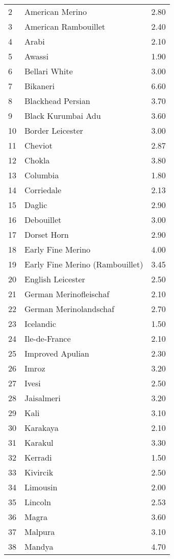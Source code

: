 \begin{center}
\begin{longtable}{|p{1.0in}|p{2.0in}|p{1.0in}|}
  2 &  American Merino & 2.80 \\ 
  3 &  American Rambouillet & 2.40 \\ 
  4 &  Arabi & 2.10 \\ 
  5 &  Awassi & 1.90 \\ 
  6 &  Bellari White & 3.00 \\ 
  7 &  Bikaneri & 6.60 \\ 
  8 &  Blackhead Persian & 3.70 \\ 
  9 &  Black Kurumbai Adu & 3.60 \\ 
  10 &  Border Leicester & 3.00 \\ 
  11 &  Cheviot & 2.87 \\ 
  12 &  Chokla & 3.80 \\ 
  13 &  Columbia & 1.80 \\ 
  14 &  Corriedale & 2.13 \\ 
  15 &  Daglic & 2.90 \\ 
  16 &  Debouillet & 3.00 \\ 
  17 &  Dorset Horn & 2.90 \\ 
  18 &  Early Fine Merino & 4.00 \\ 
  19 &  Early Fine Merino (Rambouillet) & 3.45 \\ 
  20 &  English Leicester & 2.50 \\ 
  21 &  German Merinofleischaf & 2.10 \\ 
  22 &  German Merinolandschaf & 2.70 \\ 
  23 &  Icelandic & 1.50 \\ 
  24 &  Ile-de-France & 2.10 \\ 
  25 &  Improved Apulian & 2.30 \\ 
  26 &  Imroz & 3.20 \\ 
  27 &  Ivesi & 2.50 \\ 
  28 &  Jaisalmeri & 3.20 \\ 
  29 &  Kali & 3.10 \\ 
  30 &  Karakaya & 2.10 \\ 
  31 &  Karakul & 3.30 \\ 
  32 &  Kerradi & 1.50 \\ 
  33 &  Kivircik & 2.50 \\ 
  34 &  Limousin & 2.00 \\ 
  35 &  Lincoln & 2.53 \\ 
  36 &  Magra & 3.60 \\ 
  37 &  Malpura & 3.10 \\ 
  38 &  Mandya & 4.70 \\ 

\end{longtable}
\end{center}
